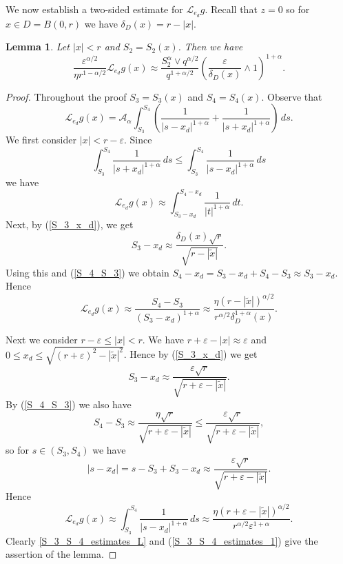\documentclass[a4paper,12pt,reqno]{amsart}
\newtheorem{lemma}[theorem]{Lemma}
\theoremstyle{definition}
\theoremstyle{remark}
\newcommand{\eps}{\varepsilon}
\newcommand{\calA}{\mathcal{A}}
\newcommand{\calL}{\mathcal{L}}
\begin{document}
We now establish a two-sided estimate for $\calL_{e_d} g$. Recall that $z = 0$ so for $x \in D = B(0,r)$ we have $\delta_D(x) = r - |x|$.
\begin{lemma}
\label{S_3_S_4_estimates}
Let $|x| <r$ and $S_2= S_2(x)$. %
Then we have
\begin{equation*}
\frac{\eps^{\alpha/2}}{\eta r^{1 - \alpha/2}} \calL_{e_d} g(x)
 \approx \frac{S_2^\alpha \vee q^{\alpha/2}}{q^{1+ \alpha/2}} \left(\frac\eps{\delta_D(x)}\wedge 1\right)^{1+\alpha}.
\end{equation*}
\end{lemma}
\begin{proof} Throughout the proof $S_3=S_3(x)$ and $S_4=S_4(x)$.
Observe that 
$$\calL_{e_d} g(x)=\calA_{\alpha} \int_{S_3}^{S_4} \left(\frac{1}{|s - x_d|^{1+\alpha}} +  \frac{1}{|s + x_d|^{1+\alpha}}\right)\, ds.$$
We first consider  $|x| <r-\eps$.
Since
$$\int_{S_3}^{S_4}   \frac{1}{|s + x_d|^{1+\alpha}}\, ds\le \int_{S_3}^{S_4} \frac{1}{|s -x_d|^{1+\alpha}}\, ds$$ 
we have
$$
\calL_{e_d} g(x)\approx \int_{S_3 - x_d}^{S_4 - x_d} \frac{1}{|t|^{1+\alpha}} \, dt.
$$
Next, by (\ref{S_3_x_d}), we get
$$
S_3 - x_d \approx \frac{\delta_D(x) \sqrt{r}}{\sqrt{r - |\tilde{x}|}}.
$$
Using this and (\ref{S_4_S_3}) we obtain $S_4 - x_d = S_3 - x_d + S_4 - S_3 \approx S_3 - x_d$.
Hence
\begin{equation}
\label{S_3_S_4_estimates_L}
\calL_{e_d} g(x) \approx
 \frac{S_4 - S_3}{(S_3 - x_d)^{1 + \alpha}}
\approx \frac{\eta (r - |\tilde{x}|)^{\alpha/2}}{r^{\alpha/2} \delta_D^{1 + \alpha}(x)}.
\end{equation}

Next we  consider  $r-\eps\le |x| <r$.
We have $r + \eps - |x| \approx \eps$ and $0 \le x_d \le \sqrt{(r+\eps)^2 - |\tilde{x}|^2}$. Hence by (\ref{S_3_x_d}) we get
$$
S_3 - x_d \approx \frac{\eps \sqrt{r}}{\sqrt{r + \eps - |\tilde{x}|}}.
$$
By (\ref{S_4_S_3}) we also have 
$$
S_4 - S_3 \approx \frac{\eta \sqrt{r}}{\sqrt{r + \eps - |\tilde{x}|}}
\le \frac{\eps \sqrt{r}}{\sqrt{r + \eps - |\tilde{x}|}},
$$
so for $s \in (S_3, S_4)$ we have
$$
|s - x_d| = s - S_3 + S_3 - x_d \approx \frac{\eps \sqrt{r}}{\sqrt{r + \eps - |\tilde{x}|}}.
$$
Hence
\begin{equation}
\label{S_3_S_4_estimates_1}
\calL_{e_d} g(x)\approx  \int_{S_3}^{S_4} \frac{1}{|s - x_d|^{1+\alpha}} \, ds
\approx \frac{\eta (r + \eps - |\tilde{x}|)^{\alpha/2}}{r^{\alpha/2} \eps^{1 + \alpha}}.
\end{equation}
Clearly  \eqref{S_3_S_4_estimates_L} and (\ref{S_3_S_4_estimates_1}) give the assertion of the lemma.
\end{proof}
\end{document}
